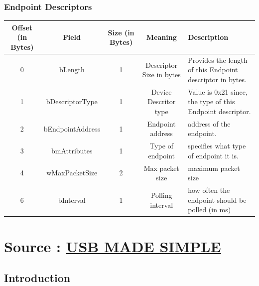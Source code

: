 \documentclass{article}
\begin{document}
\subsubsection{Endpoint Descriptors}
\begin{table}[H]
    \centering
    \begin{adjustbox}{max width=\textwidth}
        \begin{tabular}{|c|c|c|c|p{6cm}|}
            \hline
            \textbf{Offset (in Bytes)} & \textbf{Field}   & \textbf{Size (in Bytes)} & \textbf{Meaning}         & \textbf{Description}                                       \\
            \hline
            0                          & bLength          & 1                        & Descriptor Size in bytes & Provides the length of this  Endpoint descriptor in bytes. \\
            \hline
            1                          & bDescriptorType  & 1                        & Device Descritor type    & Value is 0x21 since, the type of this Endpoint descriptor. \\
            \hline
            2                          & bEndpointAddress & 1                        & Endpoint address         & address of the endpoint.                                   \\
            \hline
            3                          & bmAttributes     & 1                        & Type of endpoint         & specifies what type of endpoint it is.                     \\
            \hline
            4                          & wMaxPacketSize   & 2                        & Max packet size          & maximum packet size                                        \\
            \hline
            6                          & bInterval        & 1                        & Polling interval         & how often the endpoint should be polled (in ms)            \\
            \hline
        \end{tabular}
    \end{adjustbox}
\end{table}


\section{Source : \href{https://www.usbmadesimple.co.uk}{USB MADE SIMPLE}}

\subsection{Introduction}
\end{document}
